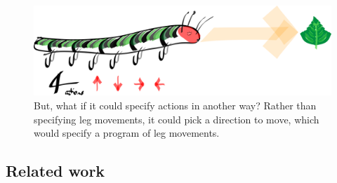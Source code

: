 \begin{figure}
\centering
\includegraphics[width=\textwidth,height=0.25\textheight]{../../pictures/drawings/full-caterpillar.png}
\caption{But, what if it could specify actions in another way? Rather than specifying leg movements, it could pick a direction to move, which would specify a program of leg movements.}
\end{figure}




\subsection{Related work}

\cite{Nagabandi2019}
